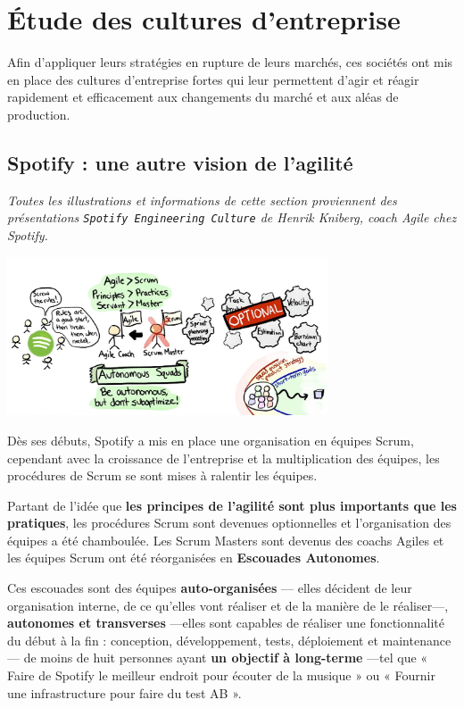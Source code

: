 \chapter{Étude des cultures d'entreprise}

Afin d'appliquer leurs stratégies en rupture de leurs marchés, ces sociétés ont mis en place des cultures d'entreprise fortes qui leur permettent d'agir et réagir rapidement et efficacement aux changements du marché et aux aléas de production.

\section{Spotify : une autre vision de l'agilité}

\textit{Toutes les illustrations et informations de cette section proviennent des présentations \texttt{Spotify Engineering Culture}\supercite{SpotifyEngineeringCulturePart1}\supercite{SpotifyEngineeringCulturePart2} de Henrik Kniberg, coach Agile chez Spotify.}

\begin{center}
\includegraphics[width=95mm]{./images_spotify/agile_scrum}
\end{center}

Dès ses débuts, Spotify a mis en place une organisation en équipes Scrum, cependant avec la croissance de l'entreprise et la multiplication des équipes, les procédures de Scrum se sont mises à ralentir les équipes.

Partant de l'idée que \textbf{les principes de l'agilité sont plus importants que les pratiques}, les procédures Scrum sont devenues optionnelles et l'organisation des équipes a été chamboulée. Les Scrum Masters sont devenus des coachs Agiles et les équipes Scrum ont été réorganisées en \textbf{Escouades Autonomes}.

Ces escouades sont des équipes \textbf{auto-organisées} --- elles décident de leur organisation interne, de ce qu'elles vont réaliser et de la manière de le réaliser---, \textbf{autonomes et transverses} ---elles sont capables de réaliser une fonctionnalité du début à la fin : conception, développement, tests, déploiement et maintenance--- de moins de huit personnes ayant \textbf{un objectif à long-terme} ---tel que « Faire de Spotify le meilleur endroit pour écouter de la musique » ou « Fournir une infrastructure pour faire du test AB ».

